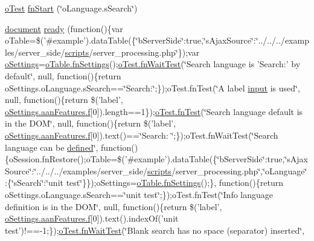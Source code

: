 \begin{DoxyCompactItemize}
\item 
\hyperlink{unit__test_8js_a3b2d259e2df3b6860d9047a92d09d0d6}{o\+Test} \hyperlink{4__server-side_2o_language_8s_search_8js_a802f7de970b68430b9215ed5402ab85f}{fn\+Start} (\char`\"{}o\+Language.\+s\+Search\char`\"{})
\item 
\hyperlink{outside_events_8js_aa14f8e0338cced6720590fd2ea13bd4b}{document} \hyperlink{4__server-side_2o_language_8s_search_8js_ac520c66c085cf4d416683b66774dd8be}{ready} (function()\{var o\+Table=\$('\#example').data\+Table(\{\char`\"{}b\+Server\+Side\char`\"{}\+:true,\char`\"{}s\+Ajax\+Source\char`\"{}\+:\char`\"{}../../../examples/server\+\_\+side/\hyperlink{tinymce_8jquery_8dev_8js_a09066d4d580eeec222f858d588b4cdef}{scripts}/server\+\_\+processing.\+php\char`\"{}\});var \hyperlink{model_8settings_8js_a4857b9c813b4dea010668e9555d0aca7}{o\+Settings}=\hyperlink{api_8methods_8js_a78f387fab92a85c2cb7830bc5d8a6141}{o\+Table.\+fn\+Settings}();\hyperlink{onhold_24__server-side_2__zero__config_8js_ab25c4d596771c0133cdc45178ce72c3d}{o\+Test.\+fn\+Wait\+Test}(\char`\"{}Search language is 'Search\+:' by default\char`\"{}, null, function()\{return o\+Settings.\+o\+Language.\+s\+Search==\char`\"{}Search\+:\char`\"{};\});o\+Test.\+fn\+Test(\char`\"{}A label \hyperlink{validate_8js_a07a2aabd64594dc36dd810cad2669deb}{input} is used\char`\"{}, null, function()\{return \$('label', \hyperlink{jquery_8fancybox_8pack_8js_ad5a69a22a09c1158b06b6f2c53bf04f1}{o\+Settings.\+aan\+Features.\+f}\mbox{[}0\mbox{]}).length==1\});\hyperlink{__zero__config__objects__subarrays_8js_a7f100cfe8617a03cd30c47b5e15396a4}{o\+Test.\+fn\+Test}(\char`\"{}Search language default is in the D\+O\+M\char`\"{}, null, function()\{return \$('label', \hyperlink{jquery_8fancybox_8pack_8js_ad5a69a22a09c1158b06b6f2c53bf04f1}{o\+Settings.\+aan\+Features.\+f}\mbox{[}0\mbox{]}).text()==\char`\"{}Search\+: \char`\"{};\});o\+Test.\+fn\+Wait\+Test(\char`\"{}Search language can be \hyperlink{tinymce_8js_a8cb6212cde9926d156ab5912c9b547cf}{defined}\char`\"{}, function()\{o\+Session.\+fn\+Restore();o\+Table=\$('\#example').data\+Table(\{\char`\"{}b\+Server\+Side\char`\"{}\+:true,\char`\"{}s\+Ajax\+Source\char`\"{}\+:\char`\"{}../../../examples/server\+\_\+side/\hyperlink{tinymce_8jquery_8dev_8js_a09066d4d580eeec222f858d588b4cdef}{scripts}/server\+\_\+processing.\+php\char`\"{},\char`\"{}o\+Language\char`\"{}\+:\{\char`\"{}s\+Search\char`\"{}\+:\char`\"{}unit test\char`\"{}\}\});o\+Settings=\hyperlink{api_8methods_8js_a78f387fab92a85c2cb7830bc5d8a6141}{o\+Table.\+fn\+Settings}();\}, function()\{return o\+Settings.\+o\+Language.\+s\+Search==\char`\"{}unit test\char`\"{};\});o\+Test.\+fn\+Test(\char`\"{}Info language definition is in the D\+O\+M\char`\"{}, null, function()\{return \$('label', \hyperlink{jquery_8fancybox_8pack_8js_ad5a69a22a09c1158b06b6f2c53bf04f1}{o\+Settings.\+aan\+Features.\+f}\mbox{[}0\mbox{]}).text().index\+Of('unit test')!==-\/1;\});\hyperlink{onhold_24__server-side_2__zero__config_8js_ab25c4d596771c0133cdc45178ce72c3d}{o\+Test.\+fn\+Wait\+Test}(\char`\"{}Blank search has no space (separator) inserted\char`\"{}, 
\end{DoxyCompactItemize}
